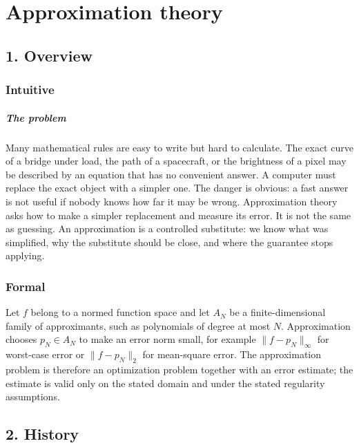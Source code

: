 \clearpage\chapter{Approximation theory}
\section*{1. Overview}
\subsection*{Intuitive}
\paragraph{The problem}
Many mathematical rules are easy to write but hard to calculate. The exact curve of a bridge under load, the path of a spacecraft, or the brightness of a pixel may be described by an equation that has no convenient answer. A computer must replace the exact object with a simpler one. The danger is obvious: a fast answer is not useful if nobody knows how far it may be wrong.
Approximation theory asks how to make a simpler replacement and measure its error. It is not the same as guessing. An approximation is a controlled substitute: we know what was simplified, why the substitute should be close, and where the guarantee stops applying.


\subsection*{Formal}
Let $f$ belong to a normed function space and let $A_N$ be a finite-dimensional family of approximants, such as polynomials of degree at most $N$. Approximation chooses $p_N\in A_N$ to make an error norm small, for example $\|f-p_N\|_\infty$ for worst-case error or $\|f-p_N\|_2$ for mean-square error. The approximation problem is therefore an optimization problem together with an error estimate; the estimate is valid only on the stated domain and under the stated regularity assumptions.
\section*{2. History}
